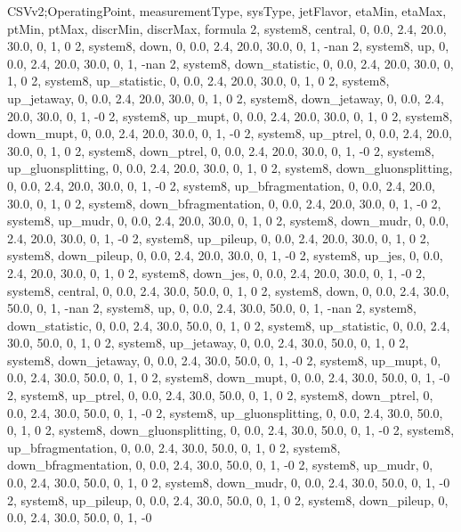 CSVv2;OperatingPoint, measurementType, sysType, jetFlavor, etaMin, etaMax, ptMin, ptMax, discrMin, discrMax, formula
2, system8, central,    0, 0.0, 2.4, 20.0, 30.0, 0, 1, 0
2, system8, down,       0, 0.0, 2.4, 20.0, 30.0, 0, 1, -nan
2, system8, up,         0, 0.0, 2.4, 20.0, 30.0, 0, 1, -nan
2, system8, down_statistic,       0, 0.0, 2.4, 20.0, 30.0, 0, 1, 0
2, system8, up_statistic,         0, 0.0, 2.4, 20.0, 30.0, 0, 1, 0
2, system8, up_jetaway,      0, 0.0, 2.4, 20.0, 30.0, 0, 1, 0
2, system8, down_jetaway,    0, 0.0, 2.4, 20.0, 30.0, 0, 1, -0
2, system8, up_mupt,         0, 0.0, 2.4, 20.0, 30.0, 0, 1, 0
2, system8, down_mupt,       0, 0.0, 2.4, 20.0, 30.0, 0, 1, -0
2, system8, up_ptrel,        0, 0.0, 2.4, 20.0, 30.0, 0, 1, 0
2, system8, down_ptrel,      0, 0.0, 2.4, 20.0, 30.0, 0, 1, -0
2, system8, up_gluonsplitting, 0, 0.0, 2.4, 20.0, 30.0, 0, 1, 0
2, system8, down_gluonsplitting, 0, 0.0, 2.4, 20.0, 30.0, 0, 1, -0
2, system8, up_bfragmentation, 0, 0.0, 2.4, 20.0, 30.0, 0, 1, 0
2, system8, down_bfragmentation, 0, 0.0, 2.4, 20.0, 30.0, 0, 1, -0
2, system8, up_mudr,         0, 0.0, 2.4, 20.0, 30.0, 0, 1, 0
2, system8, down_mudr,       0, 0.0, 2.4, 20.0, 30.0, 0, 1, -0
2, system8, up_pileup,       0, 0.0, 2.4, 20.0, 30.0, 0, 1, 0
2, system8, down_pileup,     0, 0.0, 2.4, 20.0, 30.0, 0, 1, -0
2, system8, up_jes,          0, 0.0, 2.4, 20.0, 30.0, 0, 1, 0
2, system8, down_jes,        0, 0.0, 2.4, 20.0, 30.0, 0, 1, -0
2, system8, central,    0, 0.0, 2.4, 30.0, 50.0, 0, 1, 0
2, system8, down,       0, 0.0, 2.4, 30.0, 50.0, 0, 1, -nan
2, system8, up,         0, 0.0, 2.4, 30.0, 50.0, 0, 1, -nan
2, system8, down_statistic,       0, 0.0, 2.4, 30.0, 50.0, 0, 1, 0
2, system8, up_statistic,         0, 0.0, 2.4, 30.0, 50.0, 0, 1, 0
2, system8, up_jetaway,      0, 0.0, 2.4, 30.0, 50.0, 0, 1, 0
2, system8, down_jetaway,    0, 0.0, 2.4, 30.0, 50.0, 0, 1, -0
2, system8, up_mupt,         0, 0.0, 2.4, 30.0, 50.0, 0, 1, 0
2, system8, down_mupt,       0, 0.0, 2.4, 30.0, 50.0, 0, 1, -0
2, system8, up_ptrel,        0, 0.0, 2.4, 30.0, 50.0, 0, 1, 0
2, system8, down_ptrel,      0, 0.0, 2.4, 30.0, 50.0, 0, 1, -0
2, system8, up_gluonsplitting, 0, 0.0, 2.4, 30.0, 50.0, 0, 1, 0
2, system8, down_gluonsplitting, 0, 0.0, 2.4, 30.0, 50.0, 0, 1, -0
2, system8, up_bfragmentation, 0, 0.0, 2.4, 30.0, 50.0, 0, 1, 0
2, system8, down_bfragmentation, 0, 0.0, 2.4, 30.0, 50.0, 0, 1, -0
2, system8, up_mudr,         0, 0.0, 2.4, 30.0, 50.0, 0, 1, 0
2, system8, down_mudr,       0, 0.0, 2.4, 30.0, 50.0, 0, 1, -0
2, system8, up_pileup,       0, 0.0, 2.4, 30.0, 50.0, 0, 1, 0
2, system8, down_pileup,     0, 0.0, 2.4, 30.0, 50.0, 0, 1, -0
